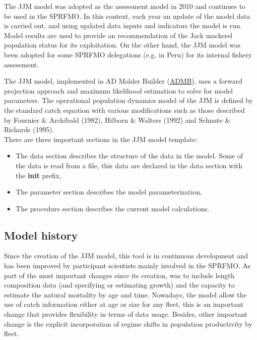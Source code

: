 \documentclass{article}
\begin{document}
The JJM model was adopted as the assessment model in 2010 and continues to be used in the SPRFMO. In this context, each year an update of the model data is carried out, and using updated data inputs and indicators the model is run. Model results are used to provide an recommendation of the Jack mackerel population status for its exploitation. On the other hand, the JJM model was been adopted for some SPRFMO delegations (e.g. in Peru) for its internal fishery assessment.

The JJM model, implemented in AD Molder Builder (\href{https://www.admb-project.org/}{ADMB}), uses a forward projection approach and maximum likelihood estimation to solve for model parameters. The operational population dynamics model of the JJM is defined by the standard catch equation with various modifications such as those described by Fournier \& Archibald (1982), Hilborn \& Walters (1992) and Schnute \& Richards (1995)\cite{sc10report}.\\


There are three important sections in the JJM model template\cite{admbmanual}:

\begin{itemize}
    \item The data section describes the structure of the data in the model. Some of the data is read from a file, this data are declared in the data section  with the  \textbf{init} prefix,
    \item The parameter section describes the model parameterization,
    \item The procedure section describes the current model calculations.
\end{itemize}





\subsection{Model history}
Since the creation of the JJM model, this tool is in continuous development and has been improved by participant scientists mainly involved in the SPRFMO. As part of the most important changes since its creation, was to include length composition data (and specifying or estimating growth) and the capacity to estimate the natural mortality by age and time. Nowadays, the model allow the use of catch information either at age or size for any fleet, this is an important change that provides flexibility in terms of data usage. Besides, other important change is the explicit incorporation of regime shifts in population productivity by fleet.
\end{document}

